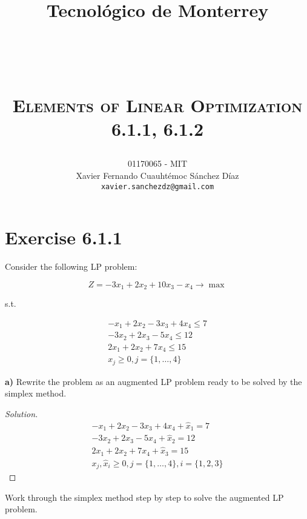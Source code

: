 \documentclass[titlepage, letterpaper, fleqn]{article}
\title{
\vspace{1in}
\textbf{Tecnológico de Monterrey} \\
\vspace{0.5in}
\textmd{\mahclass} \\
\large{\textit{\mahteacher}} \\
\vspace{0.5in}
\textsc{\mahtitle}\\
\textsc{Elements of Linear Optimization}\\
\textsc{6.1.1, 6.1.2}\\
\author{01170065  - MIT \\
Xavier Fernando Cuauhtémoc Sánchez Díaz \\
\texttt{xavier.sanchezdz@gmail.com}}
\date{\mahdate}
}
\newcommand{\spacepls}{\vspace{5mm}}
\renewcommand\qedsymbol{\(\blacksquare\)}
\newenvironment{solution}
{\renewcommand\qedsymbol{$\square$}\begin{proof}[Solution]}
{\end{proof}}
\begin{document}
\begin{titlepage}
\maketitle
\end{titlepage}

%
%

\section{Exercise 6.1.1}

{\large Consider the following LP problem:

$$Z = -3x_1 + 2x_2 + 10x_3 - x_4 \to \max$$

s.t.

\begin{align*}
    -x_1 + 2x_2 -3x_3 + 4x_4 \leq 7 \\
    -3x_2 + 2x_3 - 5x_4 \leq 12 \\
    2x_1 + 2x_2 + 7x_4 \leq 15 \\
    x_j \geq 0, j = \{1, \dots , 4\}
\end{align*}

\textbf{a)} Rewrite the problem as an augmented LP problem ready to be solved by the simplex method.}

\begin{solution}
\begin{align*}
    -x_1 + 2x_2 -3x_3 + 4x_4 + \widehat{x}_1 = 7 \\
    -3x_2 + 2x_3 - 5x_4 + \widehat{x}_2 =  12 \\
    2x_1 + 2x_2 + 7x_4 + \widehat{x}_3 =  15 \\
    x_j, \widehat{x}_i \geq 0, j = \{1, \dots , 4\}, i = \{1, 2 , 3\}
\end{align*}

\end{solution}

\spacepls

{\large Work through the simplex method step by step to solve the augmented LP problem.}
\end{document}
